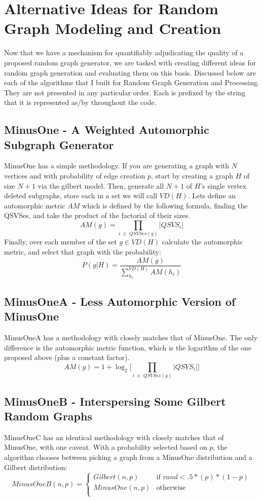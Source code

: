 \section{Alternative Ideas for Random Graph Modeling and Creation}

Now that we have a mechanism for quantifiably adjudicating the quality of a proposed random graph generator, we are tasked with creating different ideas for random graph generation and evaluating them on this basis.
Discussed below are each of the algorithms that I built for Random Graph Generation and Processing.
They are not presented in any particular order.
Each is prefixed by the string that it is represented as/by throughout the code.

\subsection{MinusOne - A Weighted Automorphic Subgraph Generator}

MinusOne has a simple methodology.
If you are generating a graph with $N$ vertices and with probability of edge creation $p$, start by creating a graph $H$ of size $N+1$ via the gilbert model.
Then, generate all $N+1$ of $H$'s single vertex deleted subgraphs, store each in a set we will call $VD(H)$.
Lets define an automorphic metric $AM$ which is defined by the following formula, finding the QSVSes, and take the product of the factorial of their sizes.
$$AM(g) = \prod_{i \;\in \;QSVSes(g)} |QSVS_i|$$
Finally, over each member of the set $g \in VD(H)$ calculate the automorphic metric, and select that graph with the probability:
$$P(g | H) = \frac{AM(g)}{\sum_{h_i}^{VD(H)} AM(h_i)}$$

\subsection{MinusOneA - Less Automorphic Version of MinusOne}

MinusOneA has a methodology with closely matches that of MinusOne.
The only difference is the automorphic metric function, which is the logarithm of the one proposed above (plus a constant factor).
$$AM(g) = 1 + \log_2 \Big[{\prod_{i \;\in \;QSVSes(g)} |QSVS_i|} \Big]$$

\subsection{MinusOneB - Interspersing Some Gilbert Random Graphs}

MinusOneC has an identical methodology with closely matches that of MinusOne, with one caveat.
With a probability selected based on $p$, the algorithm chooses between picking a graph from a MinusOne distribution and a Gilbert distribution:
\[ MinusOneB(n, p) = \begin{cases} 
      Gilbert(n, p) & \text{if $rand < .5 * (p) * (1-p)$} \\
      MinusOne(n, p) & \text{otherwise} \\
   \end{cases}
\]

